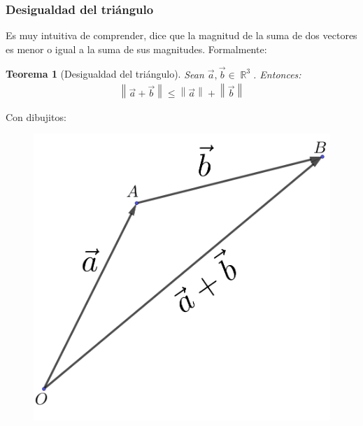 \documentclass[12pt, fleqn]{report}                             %
\newtheorem{Theorem}{Teorema}[section]                          %
\theoremstyle{break}                                            %
\DeclareMathOperator \Reals        {\mathbb{R}}                 %
\newcommand{\Abs}[1]{\left\lVert #1 \right\lVert}               %
\begin{document}
            
            \clearpage
            
            \subsubsection{Desigualdad del triángulo}
            
            Es muy intuitiva de comprender, dice que la magnitud de la suma de dos vectores es menor o igual a la suma de sus magnitudes. Formalmente:
            
            \begin{Theorem}[Desigualdad del triángulo]
                Sean $\vec{a}, \vec{b} \in \Reals^3$. Entonces:
                \begin{align}
                    \Abs{\vec{a}+\vec{b}} \leq \Abs{\vec{a}} + \Abs{\vec{b}} \label{triangleInequality}
                \end{align}
            \end{Theorem}
        
            Con dibujitos:
            \begin{figure}[H]
                \centering
                \includegraphics[scale=1]{triangleInequality.png}
            \end{figure}
        
\end{document}
